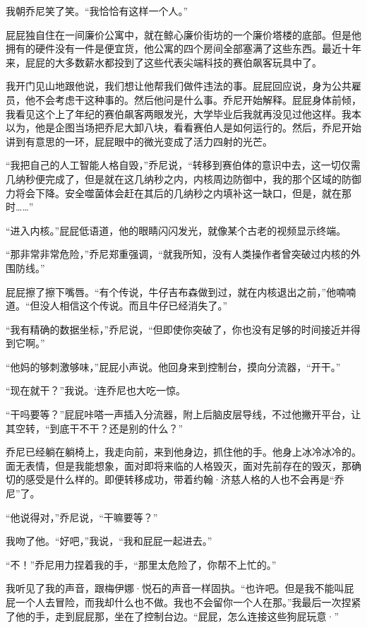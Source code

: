 \documentclass[AutoFakeBold=true]{book}
\begin{document}
我朝乔尼笑了笑。``我恰恰有这样一个人。''

\vspace*{1em}

屁屁独自住在一间廉价公寓中，就在鲸心廉价街坊的一个廉价塔楼的底部。但是他拥有的硬件没有一件是便宜货，他公寓的四个房间全部塞满了这些东西。最近十年来，屁屁的大多数薪水都投到了这些代表尖端科技的赛伯飙客玩具中了。

我开门见山地跟他说，我们想让他帮我们做件违法的事。屁屁回应说，身为公共雇员，他不会考虑干这种事的。然后他问是什么事。乔尼开始解释。屁屁身体前倾，我看见这个上了年纪的赛伯飙客两眼发光，大学毕业后我就再没见过他这样。我本以为，他是企图当场把乔尼大卸八块，看看赛伯人是如何运行的。然后，乔尼开始讲到有意思的一环，屁屁眼中的微光变成了活力四射的光芒。

``我把自己的人工智能人格自毁，''乔尼说，``转移到赛伯体的意识中去，这一切仅需几纳秒便完成了，但是就在这几纳秒之内，内核周边防御中，我的那个区域的防御力将会下降。安全噬菌体会赶在其后的几纳秒之内填补这一缺口，但是，就在那时……''

``进入内核。''屁屁低语道，他的眼睛闪闪发光，就像某个古老的视频显示终端。

``那非常非常危险，''乔尼郑重强调，``就我所知，没有人类操作者曾突破过内核的外围防线。''

屁屁擦了擦下嘴唇。``有个传说，牛仔吉布森做到过，就在内核退出之前，''他喃喃道。``但没人相信这个传说。而且牛仔已经消失了。''

``我有精确的数据坐标，''乔尼说，``但即使你突破了，你也没有足够的时间接近并得到它啊。''

``他妈的够刺激够味，''屁屁小声说。他回身来到控制台，摸向分流器，``开干。''

``现在就干？''我说。`连乔尼也大吃一惊。

``干吗要等？''屁屁咔嗒一声插入分流器，附上后脑皮层导线，不过他撇开平台，让其空转，``到底干不干？还是别的什么？''

乔尼已经躺在躺椅上，我走向前，来到他身边，抓住他的手。他身上冰冷冰冷的。面无表情，但是我能想象，面对即将来临的人格毁灭，面对先前存在的毁灭，那确切的感受是什么样的。即便转移成功，带着约翰·济慈人格的人也不会再是``乔尼''了。

``他说得对，''乔尼说，``干嘛要等？''

我吻了他。``好吧，''我说，``我和屁屁一起进去。''

``不！''乔尼用力捏着我的手，``那里太危险了，你帮不上忙的。''

我听见了我的声音，跟梅伊娜·悦石的声音一样固执。``也许吧。但是我不能叫屁屁一个人去冒险，而我却什么也不做。我也不会留你一个人在那。''我最后一次捏紧了他的手，走到屁屁那，坐在了控制台边。``屁屁，怎么连接这些狗屁玩意·''
\end{document}

